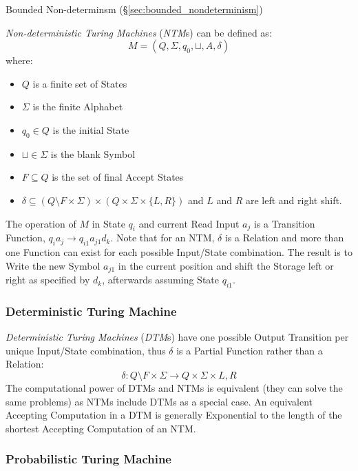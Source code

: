 \fist Bounded Non-determinsm (\S\ref{sec:bounded_nondeterminism})

\emph{Non-deterministic Turing Machines} (\emph{NTM}s) can be defined
as:
\[
  M = (Q, \Sigma, q_0, \sqcup, A, \delta)
\]
where:
\begin{itemize}
  \item $Q$ is a finite set of States
  \item $\Sigma$ is the finite Alphabet
  \item $q_0 \in Q$ is the initial State
  \item $\sqcup \in \Sigma$ is the blank Symbol
  \item $F \subseteq Q$ is the set of final Accept States
  \item $\delta \subseteq (Q \setminus F \times \Sigma) \times (Q
    \times \Sigma \times \{L,R\})$ and $L$ and $R$ are left and right
    shift.
\end{itemize}

The operation of $M$ in State $q_i$ and current Read Input $a_j$ is a
Transition Function, $q_i a_j \rightarrow q_{i1} a_{j1} d_k$. Note
that for an NTM, $\delta$ is a Relation and more than one Function can
exist for each possible Input/State combination. The result is to
Write the new Symbol $a_{j1}$ in the current position and shift the
Storage left or right as specified by $d_k$, afterwards assuming State
$q_{i1}$.



\subsubsection{Deterministic Turing Machine}
\label{sec:deterministic_turing_machine}

\emph{Deterministic Turing Machines} (\emph{DTM}s) have one possible
Output Transition per unique Input/State combination, thus $\delta$ is
a Partial Function rather than a Relation:
\[
  \delta : Q \setminus F \times \Sigma \rightarrow Q \times
  \Sigma \times {L,R}
\]
The computational power of DTMs and NTMs is equivalent (they can solve
the same problems) as NTMs include DTMs as a special case. An
equivalent Accepting Computation in a DTM is generally Exponential to
the length of the shortest Accepting Computation of an NTM.



\subsubsection{Probabilistic Turing Machine}
\label{sec:probabilistic_turing_machine}

